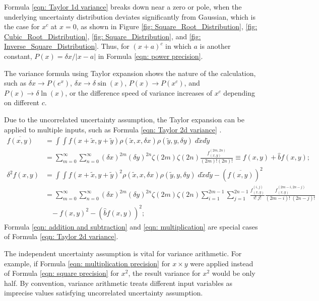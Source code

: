 \documentclass[twoside]{article}
\numberwithin{equation}{section}
\newcommand{\eqspace}{\;\;\;}
\begin{document}
Formula \eqref{eqn: Taylor 1d variance} breaks down near a zero or pole, when the underlying uncertainty distribution deviates significantly from Gaussian, which is the case for $x^c$ at $x=0$, as shown in Figure \ref{fig: Square_Root_Distribution}, \ref{fig: Cubic_Root_Distribution}, \ref{fig: Square_Distribution}, and \ref{fig: Inverse_Square_Distribution}.
Thus, for $(x+a)^c$ in which $a$ is another constant, $P(x) = \delta x / |x - a|$ in Formula \eqref{eqn: power precision}.

The variance formula using Taylor expansion shows the nature of the calculation, such as $\delta x \rightarrow P(e^x)$, $\delta x \rightarrow \delta \sin(x)$, $P(x) \rightarrow P(x^c)$, and $P(x) \rightarrow \delta \ln(x)$, or the difference speed of variance increases of $x^c$ depending on different $c$.

Due to the uncorrelated uncertainty assumption, the Taylor expansion can be applied to multiple inputs, such as Formula \eqref{eqn: Taylor 2d variance} \cite{Prev_Precision_Arithmetic} .
\begin{align}
\label{eqn: Taylor 2d mean}
\overline{f(x,y)} &= \int \int f(x + \tilde{x}, y + \tilde{y}) \rho(\tilde{x}, x, \delta x) \rho(\tilde{y}, y, \delta y)\; d \tilde{x} d \tilde{y} \nonumber \\
&= \sum_{m=0}^{\infty} \sum_{n=0}^{\infty} (\delta x)^{2m} (\delta y)^{2n} \zeta(2m) \zeta(2n)  \frac{f^{(2m,2n)}_{(x,y)}}{(2m)! (2n)!}
\equiv f(x,y) + \hat{b} f(x,y); \\
\label{eqn: Taylor 2d variance}
\delta^2 f(x, y) &= \int \int f(x + \tilde{x}, y + \tilde{y})^2 
    \rho(\tilde{x}, x, \delta x) \rho(\tilde{y}, y, \delta y)\; d \tilde{x} d \tilde{y} - \left( \overline{f(x, y)} \right)^2 \nonumber \\
&= \sum_{m=0}^{\infty} \sum_{n=0}^{\infty} (\delta x)^{2m} (\delta y)^{2n} \zeta(2m) \zeta(2n) 
  \sum_{i=1}^{2m-1} \sum_{j=1}^{2n-1} \frac{f^{(i,j)}_{(x,y)}}{i!\;j!}\frac{f^{(2m-i,2n-j)}_{(x,y)}}{(2m-i)!\;(2n-j)!} \nonumber \\
 &\eqspace - f(x,y)^2 - \left( \hat{b} f(x,y) \right)^2; 
\end{align}
Formula \eqref{eqn: addition and subtraction} and \eqref{eqn: multiplication} are special cases of Formula \eqref{eqn: Taylor 2d variance}.

The independent uncertainty assumption is vital for variance arithmetic.
For example, if Formula \eqref{eqn: multiplication precision} for $x \times y$ were applied instead of Formula \eqref{eqn: square precision} for $x^2$, the result variance for $x^2$ would be only half.
By convention, variance arithmetic treats different input variables as imprecise values satisfying uncorrelated uncertainty assumption.
\end{document}
